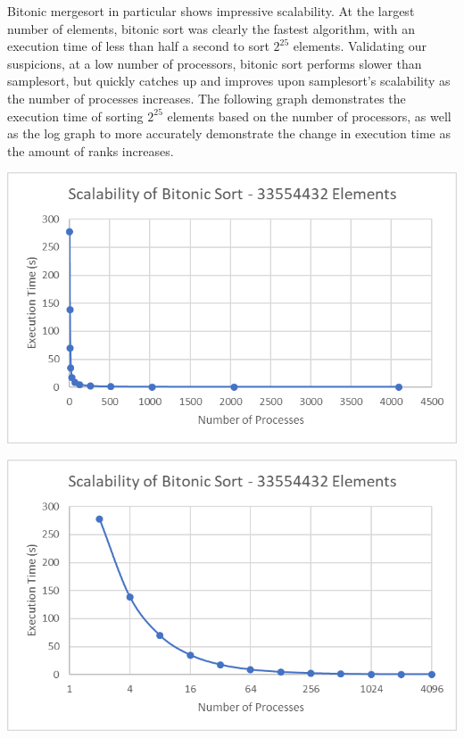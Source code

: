 \documentclass[10pt,letterpaper]{article}
\begin{document}
\begin{multicols}{2}
Bitonic mergesort in particular shows impressive scalability. At the largest number of elements, bitonic sort was clearly the fastest algorithm, with an execution time of less than half a second to sort $2^{25}$ elements. Validating our suspicions, at a low number of processors, bitonic sort performs slower than samplesort, but quickly catches up and improves upon samplesort's scalability as the number of processes increases. The following graph demonstrates the execution time of sorting $2^{25}$ elements based on the number of processors, as well as the log graph to more accurately demonstrate the change in execution time as the amount of ranks increases.

\begin{center}
\includegraphics[scale=1]{bitonicsort_33554432}
\end{center}

\begin{center}
\includegraphics[scale=1]{bitonicsort_33554432_log}
\end{center}


\end{multicols}
\end{document}
